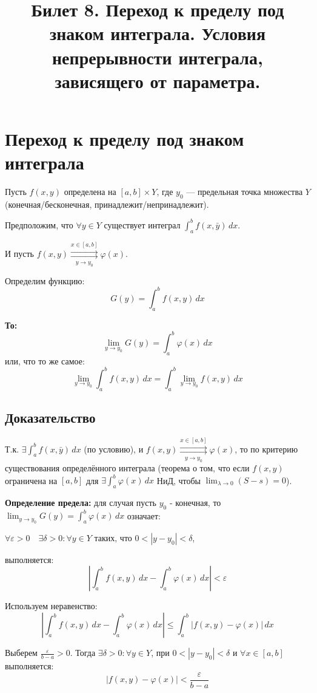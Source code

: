 \documentclass{article}
\title{ Билет 8. Переход к пределу под знаком интеграла. Условия непрерывности интеграла, зависящего от параметра.}
\author{}
\date{}
\begin{document}
\maketitle


\section*{Переход к пределу под знаком интеграла}

Пусть $f(x,y)$ определена на $[a,b] \times Y$, где $y_0$ — предельная точка множества $Y$ (конечная/бесконечная, принадлежит/непринадлежит).

Предположим, что $\forall y \in Y$ существует интеграл $\int_a^b f(x,\bar{y}) \, dx$.

И пусть \quad $f(x, y) \mathop{\rightrightarrows}\limits^{ x \in [a, b]}_{\,y \to y_0\,} \varphi(x)$.


Определим функцию:
\[
G(y) = \int_a^b f(x,y) \, dx
\]

\textbf{То:}
\[
\lim_{y \to y_0} G(y) = \int_a^b \varphi(x) \, dx
\]
или, что то же самое:
\[
\lim_{y \to y_0} \int_a^b f(x,y) \, dx = \int_a^b \lim_{y \to y_0} f(x,y) \, dx
\]

\subsection*{Доказательство}

Т.к. $\exists \int_a^b f(x,\bar{y}) \, dx$ (по условию), и \quad $f(x, y) \mathop{\rightrightarrows}\limits^{x \in [a, b]}_{\,y \to y_0\,} \varphi(x)$,  
то по критерию существования определённого интеграла (теорема о том, что если $f(x, y)$ ограничена на $[a,b]$ для $\exists \int_a^b \varphi(x) \, dx$ НиД, чтобы $\lim_{\lambda \to 0}(S - s) = 0$).

\textbf{Определение предела:} для случая пусть $y_0$ - конечная, то
$\lim_{y \to y_0} G(y) = \int_a^b \varphi(x) \, dx$ означает:

$\forall \varepsilon > 0 \quad \exists \delta > 0 : \forall y \in Y \text{ таких, что } 0 < |y - y_0| < \delta$,

выполняется:
\[
\left| \int_a^b f(x,y) \, dx - \int_a^b \varphi(x) \, dx \right| < \varepsilon
\]

Используем неравенство:
\[
\left| \int_a^b f(x,y) \, dx - \int_a^b \varphi(x) \, dx \right| \leq \int_a^b |f(x,y) - \varphi(x)| \, dx
\]

Выберем $\frac{\varepsilon}{b-a} > 0$. Тогда $\exists \delta > 0 : \forall y \in Y$, при $0 < |y - y_0| < \delta$ и $\forall x \in [a,b]$ выполняется:
\[
|f(x,y) - \varphi(x)| < \frac{\varepsilon}{b-a}
\]
\end{document}

